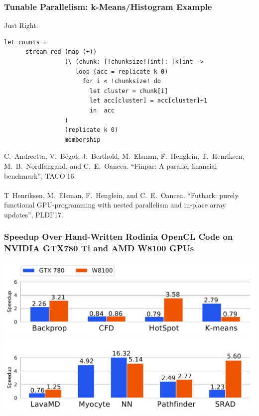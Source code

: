 \documentclass{beamer}
\newcommand{\emphh}[1]{\textcolor{CosGreen}{ #1}}
\begin{document}
\begin{frame}[fragile,t]
  \frametitle{Tunable Parallelism: k-Means/Histogram Example}

\emphh{Just Right:}
\begin{lstlisting}
let counts = 
      stream_red (map (+))
                 (\ (chunk: [!chunksize!]int): [k]int ->
                    loop (acc = replicate k 0) 
                      for i < !chunksize! do
                        let cluster = chunk[i]
                        let acc[cluster] = acc[cluster]+1
                        in  acc
                 )
                 (replicate k 0) 
                 membership
\end{lstlisting}

\smallskip

\tiny{
C.~Andreetta, V.~Bégot, J.~Berthold, M.~Elsman, F.~Henglein, T.~Henriksen, M.~B.~Nordfangand, and C.~E.~Oancea. ``Finpar: A parallel financial benchmark'', TACO'16.\\$\mbox{ }$\\
T~Henriksen, M.~Elsman, F.~Henglein, and C.~E.~Oancea. ``Futhark: purely functional GPU-programming with nested parallelism and in-place array updates'', PLDI'17.
}

\end{frame}

\begin{frame}
  \frametitle{Speedup Over Hand-Written Rodinia OpenCL Code on NVIDIA GTX780 Ti and AMD W8100 GPUs}

  \begin{center}
    \includegraphics[width=1\linewidth]{Figures/speedup0.pdf}\\\vspace{-1ex}
    \includegraphics[width=1\linewidth]{Figures/speedup1.pdf}
  \end{center}

\end{frame}
\end{document}

